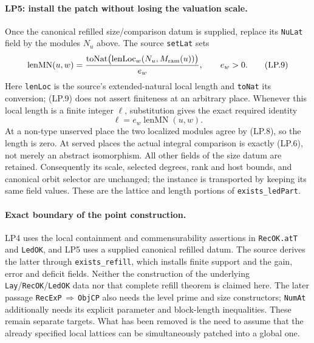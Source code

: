 \paragraph{LP5: install the patch without losing the valuation scale.}
Once the canonical refilled size/comparison datum is supplied, replace
its \texttt{NuLat} field by the modules $N_u$ above. The source
\texttt{setLat} sets
\[
 \operatorname{lenMN}(u,w)
  =\frac{\operatorname{toNat}\bigl(\operatorname{lenLoc}_w
                                      (N_u,M_{\rm ram}(u))\bigr)}{e_w},
              \qquad e_w>0.                                  \tag{LP.9}
\]
Here \texttt{lenLoc} is the source's extended-natural local length
and \texttt{toNat} its conversion; (LP.9) does not assert finiteness
at an arbitrary place. Whenever this local length is a finite integer
$\ell$, substitution gives the exact required identity
\[
                   \ell=e_w\operatorname{lenMN}(u,w).           \tag{LP.10}
\]
At a non-type unserved place the two localized modules agree by
(LP.8), so the length is zero. At served places the actual integral
comparison is exactly (LP.6), not merely an abstract isomorphism.
All other fields of the size datum are retained. Consequently its
scale, selected degrees, rank and host bounds, and canonical orbit
selector are unchanged; the instance is transported by keeping its
same field values. These are the lattice and length portions of
\texttt{exists\_ledPart}.

\paragraph{Exact boundary of the point construction.}
LP4 uses the local containment and commensurability assertions in
\texttt{RecOK.atT} and \texttt{LedOK}, and LP5 uses a supplied
canonical refilled datum. The source derives the latter through
\texttt{exists\_refill}, which installs finite support and the gain,
error and deficit fields. Neither the construction of the underlying
\texttt{Lay}/\texttt{RecOK}/\texttt{LedOK} data nor that complete
refill theorem is claimed here. The later passage
\texttt{RecExP}\,$\Rightarrow$\,\texttt{ObjCP} also needs the level
prime and size constructors; \texttt{NumAt} additionally needs its
explicit parameter and block-length inequalities. These remain
separate targets. What has been removed is the need to assume that
the already specified local lattices can be simultaneously patched
into a global one.
